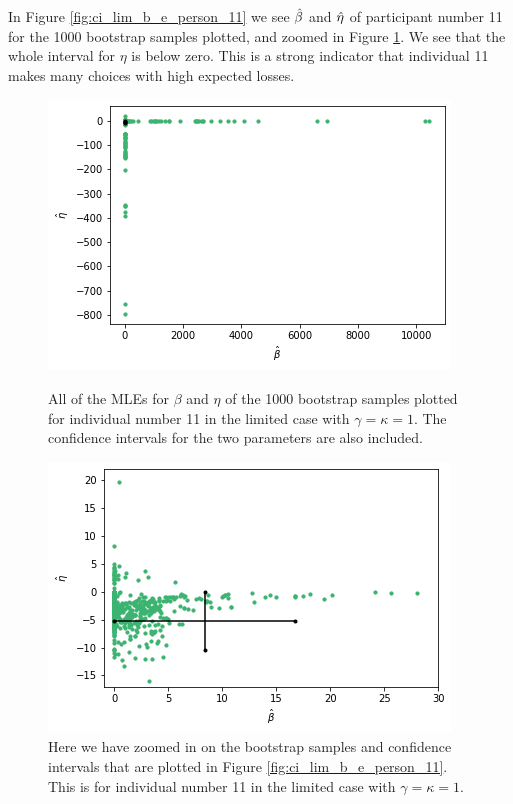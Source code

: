 In Figure \ref{fig:ci_lim_b_e_person_11} we see $\hat{\beta}$ and $\hat{\eta}$ of participant number 11 for the 1000 bootstrap samples plotted, and zoomed in Figure \ref{fig:ci_lim_b_e_person_11_zoomed}. We see that the whole interval for $\eta$ is below zero. This is a strong indicator that individual 11 makes many choices with high expected losses.
\begin{figure}
    \centering
    \begin{minipage}{0.48\textwidth}
        \centering
        \includegraphics[scale=0.37]{pictures/ci_lim_b_e_person11.png}
        \caption[MLEs for $\beta$ and $\eta$ for bootstrap samples individual 11, limited]{All of the MLEs for $\beta$ and $\eta$ of the 1000 bootstrap samples plotted for individual number 11 in the limited case with $\gamma=\kappa=1$. The confidence intervals for the two parameters are also included.}
        \label{fig:ci_lim_b_e_person_11}
    \end{minipage}\hfill
    \begin{minipage}{0.48\textwidth}
        \centering
        \includegraphics[scale=0.37]{pictures/ci_lim_b_e_person11_zoomed.png}
        \caption[MLEs for $\beta$ and $\eta$ of bootstrap samples individual 11, unlimited, zoomed]{Here we have zoomed in on the bootstrap samples and confidence intervals that are plotted in Figure \ref{fig:ci_lim_b_e_person_11}. This is for individual number 11 in the limited case with $\gamma=\kappa=1$.}
        \label{fig:ci_lim_b_e_person_11_zoomed}
    \end{minipage}
\end{figure}

